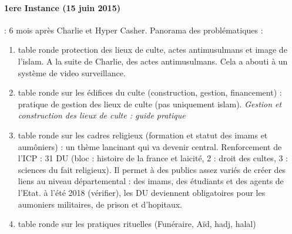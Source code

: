 \paragraph{1ere Instance (15 juin 2015)}: 6 mois après Charlie et Hyper Casher. Panorama des problématiques :
\begin{enumerate}
    \item table ronde protection des lieux de culte, actes antimusulmans et image de l’islam. A la suite de Charlie, des actes antimusulmans. Cela a abouti à un système de video surveillance.
    \item table ronde sur les édifices du culte (construction, gestion, financement) : pratique de gestion des lieux de culte (pas uniquement islam). \emph{Gestion et construction des lieux de culte : guide pratique}
    \item table ronde sur les cadres religieux (formation et statut des imams et aumôniers) : un thème lancinant qui va devenir central. Renforcement de l'ICP : 31 DU (bloc : histoire de la france et laicité, 2 : droit des cultes, 3 : sciences du fait religieux). Il permet à des publics assez variés de créer des liens au niveau départemental : des imams, des étudiants et des agents de l'Etat. à l'été 2018 (vérifier), les DU deviennent obligatoires pour les aumoniers militaires, de prison et d'hopitaux.
    \item table ronde sur les pratiques rituelles (Funéraire, Aïd, hadj, halal)  
\end{enumerate}
